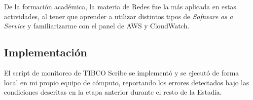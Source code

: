 De la formación académica, la materia de Redes fue la más aplicada en estas actividades, al tener que aprender a utilizar distintos tipos de \textit{Software as a Service} y familiarizarme con el panel de AWS y CloudWatch.

\subsection{Implementación}
\label{sec:implementacion}

El script de monitoreo de TIBCO Scribe se implementó y se ejecutó de forma local en mi propio equipo de cómputo, reportando los errores detectados bajo las condiciones descritas en la etapa anterior durante el resto de la Estadía.
